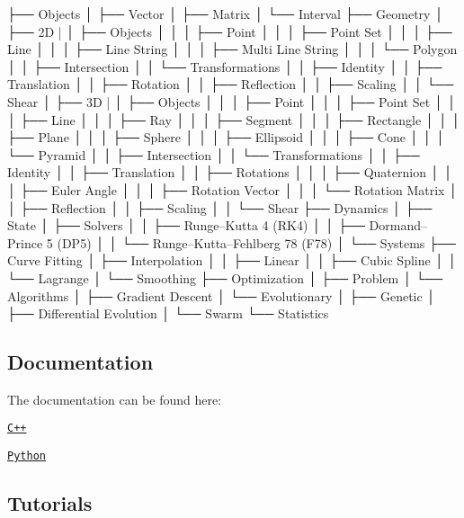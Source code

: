 \begin{DoxyCode}
├── Objects
│   ├── Vector
│   ├── Matrix
│   └── Interval
├── Geometry
│   ├── 2D
|   │   ├── Objects
│   │   │   ├── Point
│   │   │   ├── Point Set
│   │   │   ├── Line
│   │   │   ├── Line String
│   │   │   ├── Multi Line String
│   │   │   └── Polygon
│   │   ├── Intersection
│   │   └── Transformations
│   │       ├── Identity
│   │       ├── Translation
│   │       ├── Rotation
│   │       ├── Reflection
│   │       ├── Scaling
│   │       └── Shear
│   ├── 3D
|   │   ├── Objects
│   │   │   ├── Point
│   │   │   ├── Point Set
│   │   │   ├── Line
│   │   │   ├── Ray
│   │   │   ├── Segment
│   │   │   ├── Rectangle
│   │   │   ├── Plane
│   │   │   ├── Sphere
│   │   │   ├── Ellipsoid
│   │   │   ├── Cone
│   │   │   └── Pyramid
│   │   ├── Intersection
│   │   └── Transformations
│   │       ├── Identity
│   │       ├── Translation
│   │       ├── Rotations
│   │       │   ├── Quaternion
│   │       │   ├── Euler Angle
│   │       │   ├── Rotation Vector
│   │       │   └── Rotation Matrix
│   │       ├── Reflection
│   │       ├── Scaling
│   │       └── Shear
├── Dynamics
│   ├── State
│   ├── Solvers
│   │   ├── Runge–Kutta 4 (RK4)
│   │   ├── Dormand–Prince 5 (DP5)
│   │   └── Runge–Kutta–Fehlberg 78 (F78)
│   └── Systems
├── Curve Fitting
│   ├── Interpolation
│   │   ├── Linear
│   │   ├── Cubic Spline
│   │   └── Lagrange
│   └── Smoothing
├── Optimization
│   ├── Problem
│   └── Algorithms
│       ├── Gradient Descent
│       └── Evolutionary
│           ├── Genetic
│           ├── Differential Evolution
│           └── Swarm
└── Statistics
\end{DoxyCode}


\subsection*{Documentation}

The documentation can be found here\+:


\begin{DoxyItemize}
\item \href{https://open-space-collective.github.io/library-mathematics}{\tt C++}
\item \href{./bindings/python/docs}{\tt Python}
\end{DoxyItemize}

\subsection*{Tutorials}

